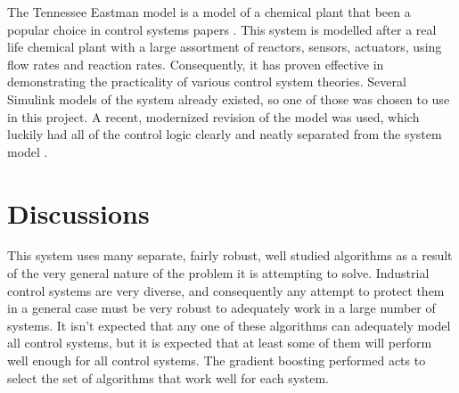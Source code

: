 \documentclass[10pt,twocolumn]{IEEEtran}
\begin{document}
The Tennessee Eastman model is a model of a chemical plant that been a popular choice in control systems papers \cite{te0,te1,te2,te3,te4}.
This system is modelled after a real life chemical plant with a large assortment of reactors, sensors, actuators, using flow rates and reaction rates.
Consequently, it has proven effective in demonstrating the practicality of various control system theories.
Several Simulink models of the system already existed, so one of those was chosen to use in this project.
A recent, modernized revision of the model was used, which luckily had all of the control logic clearly and neatly separated from the system model \cite{te_revised}.

\section{Discussions}\label{sec:discussion}
This system uses many separate, fairly robust, well studied algorithms as a result of the very general nature of the problem it is attempting to solve.
Industrial control systems are very diverse, and consequently any attempt to protect them in a general case must be very robust to adequately work in a large number of systems.
It isn't expected that any one of these algorithms can adequately model all control systems, but it is expected that at least some of them will perform well enough for all control systems.
The gradient boosting performed acts to select the set of algorithms that work well for each system.
\end{document}

